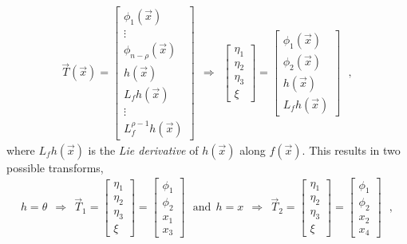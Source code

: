 \begin{align}
  \vec{T}(\vec{x})
  =
  \begin{bmatrix}
    \phi_1(\vec{x})         \\
    \vdots                  \\
    \phi_{n-\rho}(\vec{x})  \\
    h(\vec{x})              \\
    L_f h(\vec{x})          \\
    \vdots                  \\
    L_f^{\rho-1} h(\vec{x})
  \end{bmatrix}
  \ \ \Rightarrow \ \ 
  \begin{bmatrix}
    \eta_1   \\
    \eta_2   \\
    \eta_3   \\
    \xi
  \end{bmatrix}
  =
  \begin{bmatrix}
    \phi_1(\vec{x})   \\
    \phi_2(\vec{x})   \\
    h(\vec{x})        \\
    L_f h(\vec{x})
  \end{bmatrix} \ \ \ ,
  \label{eq:transformPhi} 
\end{align}
%
where $L_f h(\vec{x})$ is the \textit{Lie derivative} of $h(\vec{x})$ along $f(\vec{x})$. This results in two possible transforms, 
\begin{align}
h = \theta \ \ \Rightarrow \ \ 
  \vec{T}_1 =
  \begin{bmatrix}
    \eta_1  \\
    \eta_2  \\
    \eta_3  \\
    \xi
  \end{bmatrix}
  =
  \begin{bmatrix}
    \phi_1  \\
    \phi_2  \\
    x_1     \\
    x_3
  \end{bmatrix} \ \ \ \mathrm{and}\ \ h = x \ \ \Rightarrow \ \
  \vec{T}_2 =
  \begin{bmatrix}
    \eta_1   \\
    \eta_2   \\
    \eta_3   \\
    \xi
  \end{bmatrix}
  =
  \begin{bmatrix}
    \phi_1  \\
    \phi_2  \\
    x_2     \\
    x_4
  \end{bmatrix} \ \ \ ,
\end{align}
